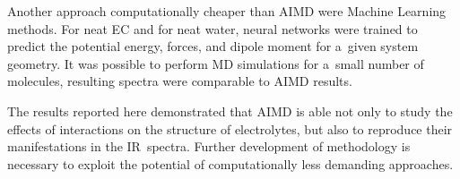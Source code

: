 Another approach computationally cheaper than AIMD were Machine Learning methods. For neat EC and for neat water, neural networks were trained to predict the potential energy, forces, and dipole moment for a~given system geometry. It was possible to perform MD simulations for a~small number of molecules, resulting spectra were comparable to AIMD results.

The results reported here demonstrated that AIMD is able not only to study the effects of interactions on the structure of electrolytes, but also to reproduce their manifestations in the IR~spectra. Further development of methodology is necessary to exploit the potential of computationally less demanding approaches.
